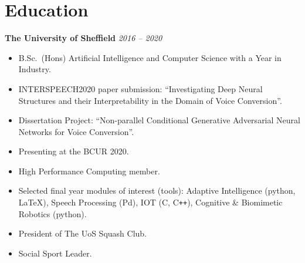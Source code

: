 \documentclass[10pt]{article} %
\begin{document}
\begin{changemargin}{0pt}{0.5pt}
\begin{minipage}[t]{0.5\textwidth}
\begin{changemargin}{5pt}{5pt}

\end{changemargin}
\end{minipage} %
\hfill
\begin{minipage}[t]{0.44\textwidth} %
\vspace{0pt} %



\section{Education}

\begin{changemargin}{5pt}{5pt}

\textbf{The University of Sheffield} \hfill \textit{ 2016 --  2020}
\vspace{-5pt}
\begin{itemize} \itemsep-2pt %
  \item B.Sc.\ (Hons) Artificial Intelligence and Computer Science with a Year in Industry.
  \item INTERSPEECH2020 paper submission: \enquote{Investigating Deep Neural Structures and their Interpretability in the Domain of Voice Conversion}.
  \item Dissertation Project: \enquote{Non-parallel Conditional Generative Adversarial Neural Networks for Voice Conversion}.
  \item Presenting at the BCUR 2020.
  \item High Performance Computing member.
  \item Selected final year modules of interest (tools):
  	\subitem Adaptive Intelligence (python, \LaTeX),
  	\subitem Speech Processing (Pd),
  	\subitem IOT (C, C\texttt{++}),
  	\subitem Cognitive \& Biomimetic Robotics (python).
  \item President of The UoS Squash Club.
  \item Social Sport Leader.
\end{itemize}


\end{changemargin}
\end{minipage}
\end{changemargin}
\end{document}
